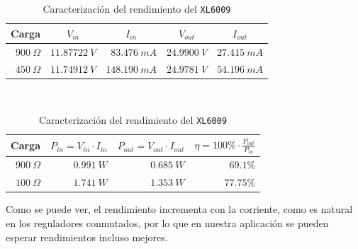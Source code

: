 \begin{table}[H]
    \centering
    \begin{subtable}[t]{\textwidth}
        \centering
        \begin{tabular}{rrrrr}
            \toprule
            \multicolumn{1}{c}{Carga} & \multicolumn{1}{c}{$V_{in}$} & \multicolumn{1}{c}{$I_{in}$} & \multicolumn{1}{c}{$V_{out}$} & \multicolumn{1}{c}{$I_{out}$}\\ \midrule
            $900\ \Omega$             & $11.87722\ V$                 & $83.476\ mA$                 & $24.9900\ V$                  & $27.415\ mA$                \\
            $450\ \Omega$             & $11.74912\ V$                 & $148.190\ mA$                & $24.9781\ V$                  & $54.196\ mA$                \\ \bottomrule
        \end{tabular}
        \caption{Medidas tomadas en laboratorio}
    \end{subtable}
    \\[0.5cm]
    \begin{subtable}[t]{\textwidth}
        \centering
        \begin{tabular}{rrrr}
            \toprule
            \multicolumn{1}{c}{Carga} & \multicolumn{1}{l}{$P_{in} = V_{in}\cdot I_{in}$} & \multicolumn{1}{l}{$P_{out} = V_{out}\cdot I_{out}$} & \multicolumn{1}{l}{$\eta = 100\%\cdot\frac{P_{out}}{P_{in}}$} \\ \midrule
            $900\ \Omega$             & $0.991\ W$                                     & $0.685\ W$                                        & $69.1\%$                                                    \\
            $100\ \Omega$             & $1.741\ W$                                    & $1.353\ W$                                       & $77.75\%$                                                    \\ \bottomrule
        \end{tabular}
        \caption{Cálculos de rendimiento realizados}
    \end{subtable}
    \caption{Caracterización del rendimiento del \texttt{XL6009}}
    \label{tab:rendimiento_elevador}
\end{table}

Como se puede ver, el rendimiento incrementa con la corriente, como es natural en los reguladores conmutados, por lo que en nuestra aplicación se pueden esperar rendimientos incluso mejores.